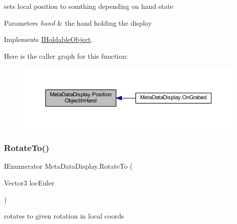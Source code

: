 sets local position to somthing depending on hand state 


\begin{DoxyParams}{Parameters}
{\em hand} & the hand holding the display\\
\hline
\end{DoxyParams}


Implements \mbox{\hyperlink{interface_i_holdable_object_a3fe2e7a7d0740225142053583f438333}{I\+Holdable\+Object}}.

Here is the caller graph for this function\+:
\nopagebreak
\begin{figure}[H]
\begin{center}
\leavevmode
\includegraphics[width=350pt]{class_meta_data_display_a1ecbc336a25464fc9999120066263e2a_icgraph}
\end{center}
\end{figure}
\mbox{\label{class_meta_data_display_adee283ec76c3631bf535ae3e5071090b}} 
\subsubsection{\texorpdfstring{Rotate\+To()}{RotateTo()}}
{\footnotesize\ttfamily I\+Enumerator Meta\+Data\+Display.\+Rotate\+To (\begin{DoxyParamCaption}\item[{Vector3}]{loc\+Euler }\end{DoxyParamCaption})\hspace{0.3cm}{\ttfamily [private]}}



rotates to given rotation in local coords 


